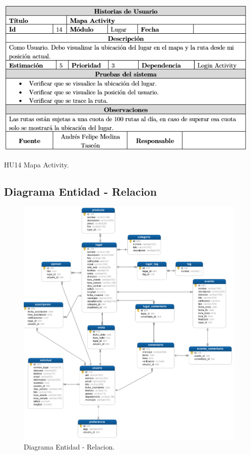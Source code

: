 \documentclass[12pt,letterpaper,openany]{book}
\begin{document}
\begin{table}[H]
\centering
\includegraphics[width=13cm]{./imagenes/HU/HU14}
\caption{HU14 Mapa Activity.}
\end{table}

\subsection{Diagrama Entidad - Relacion}
\begin{figure}[H]
\begin{center}
\includegraphics[width=16cm]{./imagenes/Diagrama_entidad_relacion}
\caption{Diagrama Entidad - Relacion.}
\end{center}
\end{figure}
\end{document}
